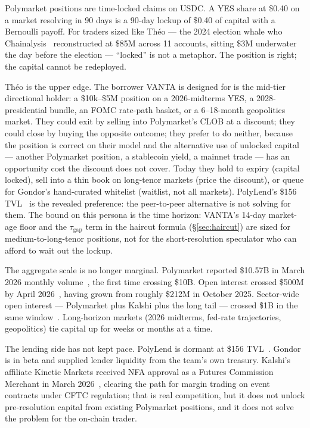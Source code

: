 \documentclass[11pt,letterpaper]{article}
\begin{document}
Polymarket positions are time-locked claims on USDC. A YES share at \$0.40 on a market resolving in 90 days is a 90-day lockup of \$0.40 of capital with a Bernoulli payoff. For traders sized like Th\'eo --- the 2024 election whale who Chainalysis~\cite{theowhale} reconstructed at \$85M across 11 accounts, sitting \$3M underwater the day before the election --- ``locked'' is not a metaphor. The position is right; the capital cannot be redeployed.

Th\'eo is the upper edge. The borrower VANTA is designed for is the mid-tier directional holder: a \$10k--\$5M position on a 2026-midterms YES, a 2028-presidential bundle, an FOMC rate-path basket, or a 6--18-month geopolitics market. They could exit by selling into Polymarket's CLOB at a discount; they could close by buying the opposite outcome; they prefer to do neither, because the position is correct on their model and the alternative use of unlocked capital --- another Polymarket position, a stablecoin yield, a mainnet trade --- has an opportunity cost the discount does not cover. Today they hold to expiry (capital locked), sell into a thin book on long-tenor markets (price the discount), or queue for Gondor's hand-curated whitelist (waitlist, not all markets). PolyLend's \$156 TVL~\cite{polylend-tvl} is the revealed preference: the peer-to-peer alternative is not solving for them. The bound on this persona is the time horizon: VANTA's 14-day market-age floor and the $\tau_{\mathrm{gap}}$ term in the haircut formula (\S\ref{sec:haircut}) are sized for medium-to-long-tenor positions, not for the short-resolution speculator who can afford to wait out the lockup.

The aggregate scale is no longer marginal. Polymarket reported \$10.57B in March 2026 monthly volume~\cite{polymarket-volume}, the first time crossing \$10B. Open interest crossed \$500M by April 2026~\cite{polymarket-oi}, having grown from roughly \$212M in October 2025. Sector-wide open interest --- Polymarket plus Kalshi plus the long tail --- crossed \$1B in the same window~\cite{predictionmarkets-1b}. Long-horizon markets (2026 midterms, fed-rate trajectories, geopolitics) tie capital up for weeks or months at a time.

The lending side has not kept pace. PolyLend is dormant at \$156 TVL~\cite{polylend-tvl}. Gondor is in beta and supplied lender liquidity from the team's own treasury. Kalshi's affiliate Kinetic Markets received NFA approval as a Futures Commission Merchant in March 2026~\cite{kalshi-fcm}, clearing the path for margin trading on event contracts under CFTC regulation; that is real competition, but it does not unlock pre-resolution capital from existing Polymarket positions, and it does not solve the problem for the on-chain trader.
\end{document}
